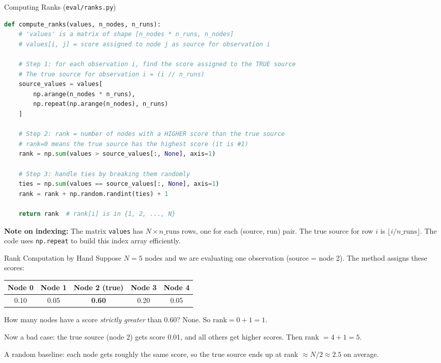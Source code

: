 \begin{codewalk}{Computing Ranks (\texttt{eval/ranks.py})}
\begin{lstlisting}[language=Python]
def compute_ranks(values, n_nodes, n_runs):
    # 'values' is a matrix of shape [n_nodes * n_runs, n_nodes]
    # values[i, j] = score assigned to node j as source for observation i

    # Step 1: for each observation i, find the score assigned to the TRUE source
    # The true source for observation i = (i // n_runs)
    source_values = values[
        np.arange(n_nodes * n_runs),
        np.repeat(np.arange(n_nodes), n_runs)
    ]

    # Step 2: rank = number of nodes with a HIGHER score than the true source
    # rank=0 means the true source has the highest score (it is #1)
    rank = np.sum(values > source_values[:, None], axis=1)

    # Step 3: handle ties by breaking them randomly
    ties = np.sum(values == source_values[:, None], axis=1)
    rank = rank + np.random.randint(ties) + 1

    return rank  # rank[i] is in {1, 2, ..., N}
\end{lstlisting}
\textbf{Note on indexing:} The matrix \texttt{values} has $N \times n\_\text{runs}$ rows, one for each (source, run) pair. The true source for row $i$ is $\lfloor i / n\_\text{runs} \rfloor$. The code uses \texttt{np.repeat} to build this index array efficiently.
\end{codewalk}

\begin{examplebox}{Rank Computation by Hand}
Suppose $N = 5$ nodes and we are evaluating one observation (source = node 2). The method assigns these scores:

\begin{center}
\begin{tabular}{ccccc}
\toprule
Node 0 & Node 1 & \textbf{Node 2 (true)} & Node 3 & Node 4 \\
\midrule
0.10   & 0.05   & \textbf{0.60}           & 0.20   & 0.05   \\
\bottomrule
\end{tabular}
\end{center}

How many nodes have a score \emph{strictly greater} than 0.60? None. So $\text{rank} = 0 + 1 = 1$.

Now a bad case: the true source (node 2) gets score 0.01, and all others get higher scores. Then rank $= 4 + 1 = 5$.

A random baseline: each node gets roughly the same score, so the true source ends up at rank $\approx N/2 \approx 2.5$ on average.
\end{examplebox}

